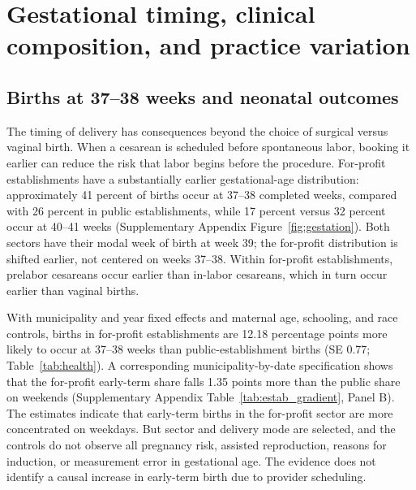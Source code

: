 \documentclass[12pt]{article}
\newcommand{\satab}[1]{Supplementary Appendix Table~\ref{#1}}
\newcommand{\safig}[1]{Supplementary Appendix Figure~\ref{#1}}
\begin{document}
\section{Gestational timing, clinical composition, and practice variation}\label{sec:cost}

\subsection{Births at 37--38 weeks and neonatal outcomes}

The timing of delivery has consequences beyond the choice of surgical versus vaginal birth. When a cesarean is scheduled before spontaneous labor, booking it earlier can reduce the risk that labor begins before the procedure. For-profit establishments have a substantially earlier gestational-age distribution: approximately 41 percent of births occur at 37--38 completed weeks, compared with 26 percent in public establishments, while 17 percent versus 32 percent occur at 40--41 weeks (\safig{fig:gestation}). Both sectors have their modal week of birth at week 39; the for-profit distribution is shifted earlier, not centered on weeks 37--38. Within for-profit establishments, prelabor cesareans occur earlier than in-labor cesareans, which in turn occur earlier than vaginal births.

With municipality and year fixed effects and maternal age, schooling, and race controls, births in for-profit establishments are 12.18 percentage points more likely to occur at 37--38 weeks than public-establishment births (SE 0.77; Table~\ref{tab:health}). A corresponding municipality-by-date specification shows that the for-profit early-term share falls 1.35 points more than the public share on weekends (\satab{tab:estab_gradient}, Panel B). The estimates indicate that early-term births in the for-profit sector are more concentrated on weekdays. But sector and delivery mode are selected, and the controls do not observe all pregnancy risk, assisted reproduction, reasons for induction, or measurement error in gestational age. The evidence does not identify a causal increase in early-term birth due to provider scheduling.
\end{document}
